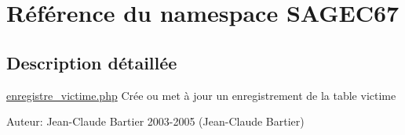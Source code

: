 \hypertarget{namespaceSAGEC67}{
\section{R\'{e}f\'{e}rence du namespace SAGEC67}
\label{namespaceSAGEC67}
}




\subsection{Description d\'{e}taill\'{e}e}
\hyperlink{enregistre__victime_8php}{enregistre\_\-victime.php} Cr\'{e}e ou met \`{a} jour un enregistrement de la table victime \begin{Desc}
\item[Auteur:]Jean-Claude Bartier  2003-2005 (Jean-Claude Bartier) \end{Desc}


